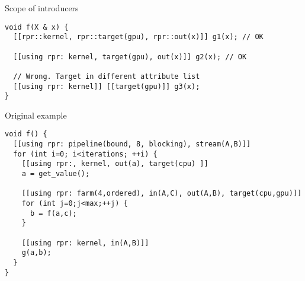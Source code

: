 \begin{frame}[t,fragile]{Scope of introducers}
\begin{lstlisting}
void f(X & x) {
  [[rpr::kernel, rpr::target(gpu), rpr::out(x)]] g1(x); // OK

  [[using rpr: kernel, target(gpu), out(x)]] g2(x); // OK

  // Wrong. Target in different attribute list
  [[using rpr: kernel]] [[target(gpu)]] g3(x); 
}
\end{lstlisting}

\end{frame}

\begin{frame}[t,fragile]{Original example}
\begin{lstlisting}[basicstyle=\footnotesize]
void f() {
  [[using rpr: pipeline(bound, 8, blocking), stream(A,B)]]
  for (int i=0; i<iterations; ++i) {
    [[using rpr:, kernel, out(a), target(cpu) ]]
    a = get_value();
    
    [[using rpr: farm(4,ordered), in(A,C), out(A,B), target(cpu,gpu)]]
    for (int j=0;j<max;++j) {
      b = f(a,c);
    }

    [[using rpr: kernel, in(A,B)]]
    g(a,b);
  }
}
\end{lstlisting}
\end{frame}
